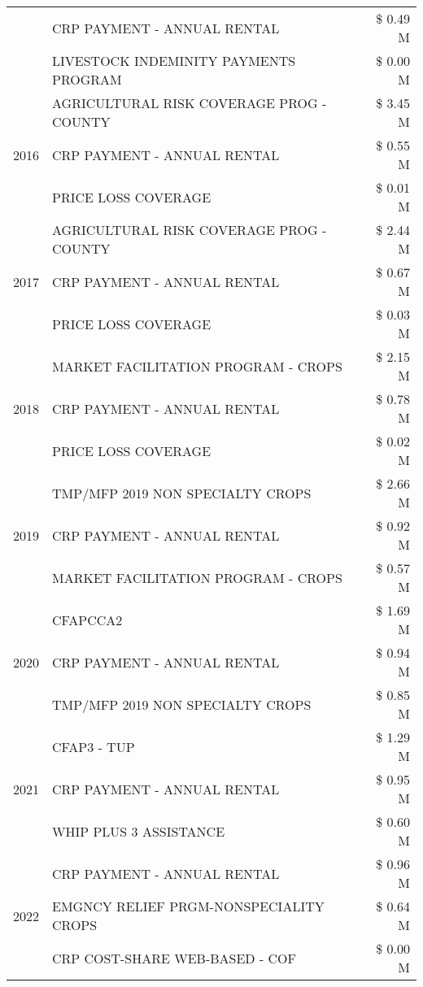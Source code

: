 \begin{tabular}{llr}
 & CRP PAYMENT - ANNUAL RENTAL & \$ 0.49 M \\
 & LIVESTOCK INDEMINITY PAYMENTS PROGRAM & \$ 0.00 M \\
\cline{1-3}
\multirow[t]{3}{*}{2016} & AGRICULTURAL RISK COVERAGE PROG - COUNTY & \$ 3.45 M \\
 & CRP PAYMENT - ANNUAL RENTAL & \$ 0.55 M \\
 & PRICE LOSS COVERAGE & \$ 0.01 M \\
\cline{1-3}
\multirow[t]{3}{*}{2017} & AGRICULTURAL RISK COVERAGE PROG - COUNTY & \$ 2.44 M \\
 & CRP PAYMENT - ANNUAL RENTAL & \$ 0.67 M \\
 & PRICE LOSS COVERAGE & \$ 0.03 M \\
\cline{1-3}
\multirow[t]{3}{*}{2018} & MARKET FACILITATION PROGRAM - CROPS & \$ 2.15 M \\
 & CRP PAYMENT - ANNUAL RENTAL & \$ 0.78 M \\
 & PRICE LOSS COVERAGE & \$ 0.02 M \\
\cline{1-3}
\multirow[t]{3}{*}{2019} & TMP/MFP 2019 NON SPECIALTY CROPS & \$ 2.66 M \\
 & CRP PAYMENT - ANNUAL RENTAL & \$ 0.92 M \\
 & MARKET FACILITATION PROGRAM - CROPS & \$ 0.57 M \\
\cline{1-3}
\multirow[t]{3}{*}{2020} & CFAPCCA2 & \$ 1.69 M \\
 & CRP PAYMENT - ANNUAL RENTAL & \$ 0.94 M \\
 & TMP/MFP 2019 NON SPECIALTY CROPS & \$ 0.85 M \\
\cline{1-3}
\multirow[t]{3}{*}{2021} & CFAP3 - TUP & \$ 1.29 M \\
 & CRP PAYMENT - ANNUAL RENTAL & \$ 0.95 M \\
 & WHIP PLUS 3 ASSISTANCE & \$ 0.60 M \\
\cline{1-3}
\multirow[t]{3}{*}{2022} & CRP PAYMENT - ANNUAL RENTAL & \$ 0.96 M \\
 & EMGNCY RELIEF PRGM-NONSPECIALITY CROPS & \$ 0.64 M \\
 & CRP COST-SHARE WEB-BASED - COF & \$ 0.00 M \\
\cline{1-3}
\bottomrule
\end{tabular}
